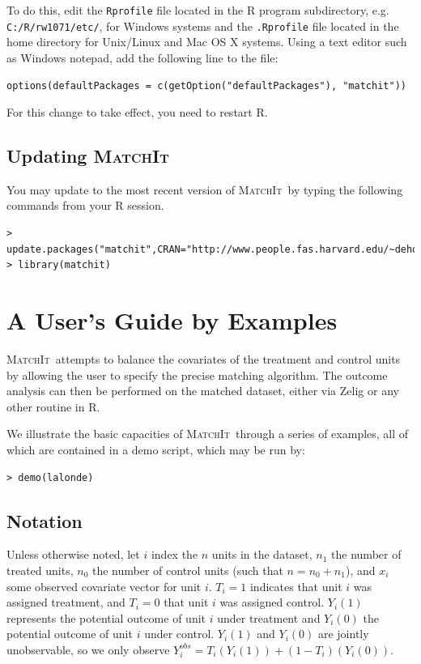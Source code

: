 \documentclass[oneside,letterpaper,titlepage]{article}
\newcommand{\MatchIt}{\textsc{MatchIt}}
\begin{document}
To do this, edit the {\tt Rprofile} file located in the R program
subdirectory, e.g. \texttt{C:/R/rw1071/etc/}, for Windows systems and
the {\tt .Rprofile} file located in the home directory for Unix/Linux
and Mac OS X systems.  Using a text editor such as Windows notepad,
add the following line to the file:
\begin{verbatim}
options(defaultPackages = c(getOption("defaultPackages"), "matchit"))
\end{verbatim}
For this change to take effect, you need to restart R.

\subsection{Updating \MatchIt}
You may update to the most recent version of \MatchIt\ by typing the
following commands from your R session.

\begin{small}
\begin{verbatim}
> update.packages("matchit",CRAN="http://www.people.fas.harvard.edu/~deho")
> library(matchit) 
\end{verbatim}
\end{small} 

\section{A User's Guide by Examples}
\MatchIt\ attempts to balance the covariates of the treatment and
control units by allowing the user to specify the precise matching
algorithm.  The outcome analysis can then be performed on the matched
dataset, either via Zelig or any other routine in R.

We illustrate the basic capacities of \MatchIt\ through a series of
examples, all of which are contained in a demo script, which may be
run by: 

\begin{verbatim}
> demo(lalonde)
\end{verbatim}

\subsection{Notation}
Unless otherwise noted, let $i$ index the $n$ units in the dataset,
$n_1$ the number of treated units, $n_0$ the number of control units
(such that $n=n_0+n_1$), and $x_i$ some observed covariate vector for
unit $i$.  $T_i=1$ indicates that unit $i$ was assigned treatment, and
$T_i=0$ that unit $i$ was assigned control.  $Y_i(1)$ represents the
potential outcome of unit $i$ under treatment and $Y_i(0)$ the
potential outcome of unit $i$ under control.  $Y_i(1)$ and $Y_i(0)$
are jointly unobservable, so we only observe
$Y_i^{obs}=T_i(Y_i(1))+(1-T_i)(Y_i(0))$.
\end{document}
